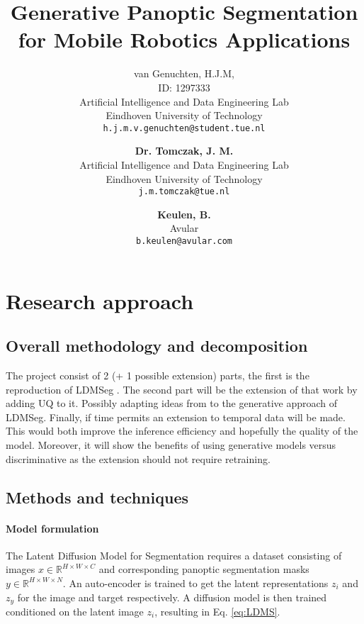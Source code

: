 \documentclass{article}
\title{Generative Panoptic Segmentation for Mobile Robotics Applications}
\author{
 van Genuchten, H.J.M, \\
 ID: 1297333\\
 Artificial Intelligence and Data Engineering Lab\\
 Eindhoven University of Technology\\
  \texttt{h.j.m.v.genuchten@student.tue.nl} \\
  \and
    \textbf{Dr. Tomczak, J. M.} \\
    Artificial Intelligence and Data Engineering Lab \\
    Eindhoven University of Technology \\
    \texttt{j.m.tomczak@tue.nl} \\
    \and
    \textbf{Keulen, B.} \\
    Avular \\
    \texttt{b.keulen@avular.com}
}
\begin{document}
\maketitle





\section{Research approach}
\label{sec:approach}
\subsection{Overall methodology and decomposition}


The project consist of 2 (+ 1 possible extension) parts, the first is the reproduction of LDMSeg \cite{vangansbeke2024ldmseg}. The second part will be the extension of that work by adding UQ to it. Possibly adapting ideas from \citep{gasperini2023segmenting} to the generative approach of LDMSeg. Finally, if time permits an extension to temporal data will be made. This would both improve the inference efficiency and hopefully the quality of the model. Moreover, it will show the benefits of using generative models versus discriminative as the extension should not require retraining.


\subsection{Methods and techniques}

\paragraph*{Model formulation} The Latent Diffusion Model for Segmentation requires a dataset consisting of images $x \in \mathbb{R}^{H\times W\times C}$ and corresponding panoptic segmentation masks $y \in \mathbb{R}^{H\times W\times N}$. An auto-encoder is trained to get the latent representations $z_i$ and $z_y$ for the image and target respectively. A diffusion model is then trained conditioned on the latent image $z_i$, resulting in Eq. \ref{eq:LDMS}.
\end{document}
